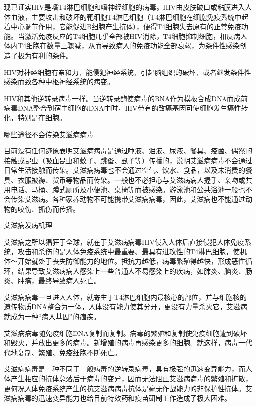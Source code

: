 \documentclass[12pt,UTF8,openany]{ctexbook}
\begin{document}
现已证实HIV是嗜T4淋巴细胞和嗜神经细胞的病毒。HIV由皮肤破口或粘膜进入人体血液，主要攻击和破坏的靶细胞T4淋巴细胞（T4淋巴细胞在细胞免疫系统中起着中心调节作用，它能促进B细胞产生抗体），便得T4细胞失去原有的正常免疫功能。当激活免疫反应的T4细胞几乎全部被HIV消除，T4细胞抑制细胞，相反病人体内T4细胞在数量上骤减，从而导致病人的免疫功能全部衰竭，为条件性感染创造了极为有利的条件。

HIV对神经细胞有亲和力，能侵犯神经系统，引起脑组织的破坏，或者继发条件性感染而致各种中枢神经系统的病变。

HIV和其他逆转录病毒一样。当逆转录酶使病毒的RNA作为模板合成DNA而成前病毒DNA整合到宿主细胞的DNA中时，HIV带有的致癌基因可使细胞发生癌性转化，特别是在细胞。





哪些途径不会传染艾滋病病毒


目前没有任何迹象表明艾滋病病毒是通过唾液、泪液、尿液、餐具、疫菌、偶然的接触或昆虫（吸血昆虫和蚊子、跳蚤、虱子等）传播的，说明艾滋病病毒不会通过日常生活接触而传染。艾滋病病毒也不会通过空气、饮水、食品，以及未消费的餐具、衣服被褥、货币等物品而传染。一般也不必担心与艾滋病病人握手、亲吻或共用电话、马桶、蹲式厕所及小便池、桌椅等而被感染。游泳池和公共浴池一般也不会传染艾滋病。各种家养动物不可能携带艾滋病病毒，因此，艾滋病也不能通过动物的咬伤、抓伤而传播。





艾滋病发病机理


艾滋病之所以猖狂于全球，就在于艾滋病病毒HIV侵入人体后直接侵犯人体免疫系统，攻击和杀伤的是人体免疫系统中最重要、最具有进攻性的T4淋巴细胞，使机体～开始就处于丧失防御能力的地位。抵抗力越低，病毒繁殖得越快，形成恶性循环，结果导致艾滋病病人感染上一些普通人不易感染上的疾病，如肺炎、脑炎、肠炎、肿瘤，最终导致病人死亡。

艾滋病病毒一旦进入人体，就寄生于T4淋巴细胞内最核心的部位，并与细胞核的遗传物质DNA整合为一体，人体没有能力使其分开，更没有力量杀灭它，艾滋病就成为一种“病入基因”的痼疾。

艾滋病病毒随免疫细胞DNA复制而复制。病毒的繁殖和复制使免疫细胞遭到破坏和毁灭，并放出更多的病毒。新增殖的病毒再感染更多的细胞。就这样，病毒一代代地复制、繁殖、免疫细胞不断死亡。

艾滋病病毒是一种不同于一般病毒的逆转录病毒，具有极强的迅速变异能力，而人体产生相应的抗体总落后于病毒的变异，因而无法阻止艾滋病病毒的繁殖和扩散，更何况人体免疫系统产生的抗艾滋病病毒抗体是毫无作战能力的非保护性抗体。艾滋病病毒的迅速变异能力也给目前特效药和疫苗研制工作造成了极大困难。
\end{document}

